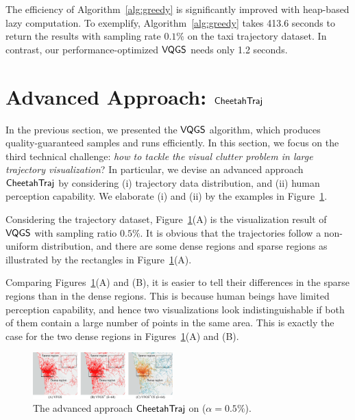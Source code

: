 The efficiency of Algorithm~\ref{alg:greedy} is significantly improved with heap-based lazy computation.
To exemplify, Algorithm~\ref{alg:greedy} takes 413.6 seconds to return the results with sampling rate $0.1\%$ on the \pt{} taxi trajectory dataset. In contrast, our performance-optimized $\mathsf{VQGS}$ needs only 1.2 seconds.


\section{Advanced Approach: $\mathsf{CheetahTraj}$}\label{sec:aa}

In the previous section, we presented the $\mathsf{VQGS}$ algorithm, which produces quality-guaranteed samples and runs efficiently. 
In this section, we focus on the third technical challenge: \emph{how to tackle the visual clutter problem in large trajectory visualization}?
In particular, we devise an advanced approach $\mathsf{CheetahTraj}$ by considering
(i) trajectory data distribution, and (ii) human perception capability.
We elaborate (i) and (ii) by the examples in Figure~\ref{fig:delta}.


 Considering the \pt{} trajectory dataset, Figure~\ref{fig:delta}(A) is the visualization result of $\mathsf{VQGS}$ with sampling ratio $0.5\%$. It is obvious that the trajectories follow a non-uniform distribution, and there are some dense regions and sparse regions as illustrated by the rectangles in Figure~\ref{fig:delta}(A).

      

 Comparing Figures~\ref{fig:delta}(A) and (B), it is easier to tell their differences in the sparse regions than in the dense regions. This is because human beings have limited  perception capability, and hence two visualizations look indistinguishable if both of them contain a large number of points in the same area. This is exactly the case for the two dense regions in Figures~\ref{fig:delta}(A) and (B).       




\begin{figure}%
	\centering
	\includegraphics[width=0.48\textwidth]{pictures/problemsolveing/delta_motivation.pdf}
	\caption{The advanced approach $\mathsf{CheetahTraj}$ on \pt{} ($\alpha = 0.5\%$).} 
	\label{fig:delta}
\end{figure}

